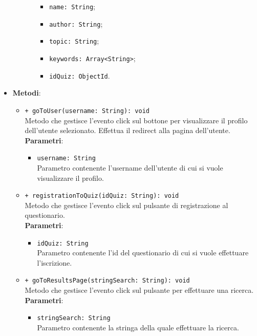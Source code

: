 \begin{itemize}
\begin{itemize}
\begin{itemize}
\begin{itemize}
					\item \texttt{name: String};
					\item \texttt{author: String};
					\item \texttt{topic: String};
					\item \texttt{keywords: Array<String>};
					\item \texttt{idQuiz: ObjectId}.
				\end{itemize}
			\end{itemize}
		\end{itemize}
		\item \textbf{Metodi}: 
		\begin{itemize}
				\item \texttt{+ goToUser(username: String): void} \\
				Metodo che gestisce l’evento click sul bottone per visualizzare il profilo dell'utente selezionato. Effettua il redirect alla pagina dell'utente.\\
				\textbf{Parametri}:
				\begin{itemize}
					\item \texttt{username: String} \\
					Parametro contenente l'username dell'utente di cui si vuole visualizzare il profilo.
				\end{itemize} 
				\item \texttt{+ registrationToQuiz(idQuiz: String): void} \\
				Metodo che gestisce l’evento click sul pulsante di registrazione al questionario.\\
				\textbf{Parametri}:
				\begin{itemize}
					\item \texttt{idQuiz: String} \\
					Parametro contenente l'id del questionario di cui si vuole effettuare l'iscrizione.
				\end{itemize} 
				\item \texttt{+ goToResultsPage(stringSearch: String): void} \\
				Metodo che gestisce l’evento click sul pulsante per effettuare una ricerca.\\
				\textbf{Parametri}:
				\begin{itemize}
					\item \texttt{stringSearch: String} \\
					Parametro contenente la stringa della quale effettuare la ricerca.
				\end{itemize} 
		\end{itemize}
	\end{itemize}

	